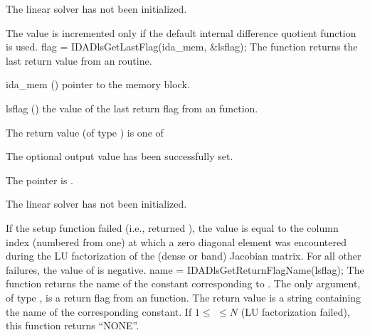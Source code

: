 {{\begin{args}
    The {\idadense} linear solver has not been initialized.
  \end{args}
}
{
  The value  is incremented only if the default 
  internal difference quotient function is used.
}
{
  flag = IDADlsGetLastFlag(ida\_mem, \&lsflag);
}
{
  The function  returns the
  last return value from an {\idadls} routine. 
}
{
  \begin{args}
  \item[ida\_mem] ()
    pointer to the {\ida} memory block.
  \item[lsflag] ()
    the value of the last return flag from an {\idadls} function.
  \end{args}
}
{
  The return value  (of type ) is one of
  \begin{args}
  \item[\Id{IDADLS\_SUCCESS}] 
    The optional output value has been successfully set.
  \item[\Id{IDADLS\_MEM\_NULL}]
    The  pointer is .
  \item[\Id{IDADLS\_LMEM\_NULL}]
    The {\idadense} linear solver has not been initialized.
  \end{args}
}
{
  If the {\idadense} setup function failed (i.e.,  returned
  ), the value  is equal to the column index
  (numbered from one) at which a zero diagonal element was encountered during
  the LU factorization of the (dense or band) Jacobian matrix.
  For all other failures, the value of  is negative.
}
{
  name = IDADlsGetReturnFlagName(lsflag);
}
{
  The function  returns the
  name of the {\idadls} constant corresponding to .
}
{
  The only argument, of type , is a return flag from an {\idadls} function.
}
{
  The return value is a string containing the name of the corresponding
  constant.  If $1 \leq $  $ \leq N$ (LU factorization failed), this
  function returns ``NONE''.
}
{}


}
